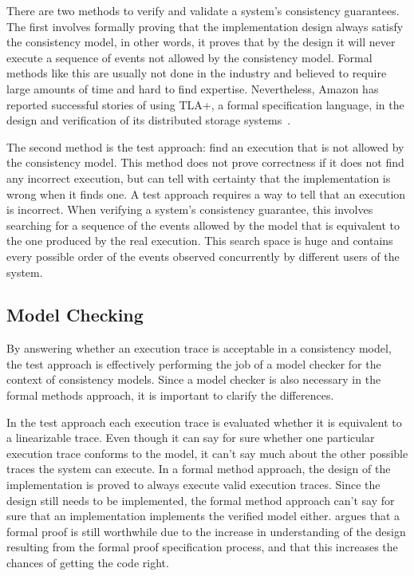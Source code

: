 \documentclass[12pt,conference]{IEEEtran}
\begin{document}
There are two methods to verify and validate a system’s consistency guarantees. The first involves formally proving that the implementation design always satisfy the consistency model, in other words, it proves that by the design it will never execute a sequence of events not allowed by the consistency model. Formal methods like this are usually not done in the industry and believed to require large amounts of time and hard to find expertise. Nevertheless, Amazon has reported successful stories of using TLA+, a formal specification language, in the design and verification of its distributed storage systems~\cite{newcombe2014use}.

The second method is the test approach: find an execution that is not allowed by the consistency model. This method does not prove correctness if it does not find any incorrect execution, but can tell with certainty that the implementation is wrong when it finds one. A test approach requires a way to tell that an execution is incorrect. When verifying a system's consistency guarantee, this involves searching for a sequence of the events allowed by the model that is equivalent to the one produced by the real execution. This search space is huge and contains every possible order of the events observed concurrently by different users of the system. 

\subsection{Model Checking}

By answering whether an execution trace is acceptable in a consistency model, the test approach is effectively performing the job of a model checker for the context of consistency models. Since a model checker is also necessary in the formal methods approach, it is important to clarify the differences. 

In the test approach each execution trace is evaluated whether it is equivalent to a linearizable trace. Even though it can say for sure whether one particular execution trace conforms to the model, it can’t say much about the other possible traces the system can execute. In a formal method approach, the design of the implementation is proved to always execute valid execution traces. Since the design still needs to be implemented, the formal method approach can’t say for sure that an implementation implements the verified model either. \cite{newcombe2014use} argues that a formal proof is still worthwhile due to the increase in understanding of the design resulting from the formal proof specification process, and that this increases the chances of getting the code right.
\end{document}
